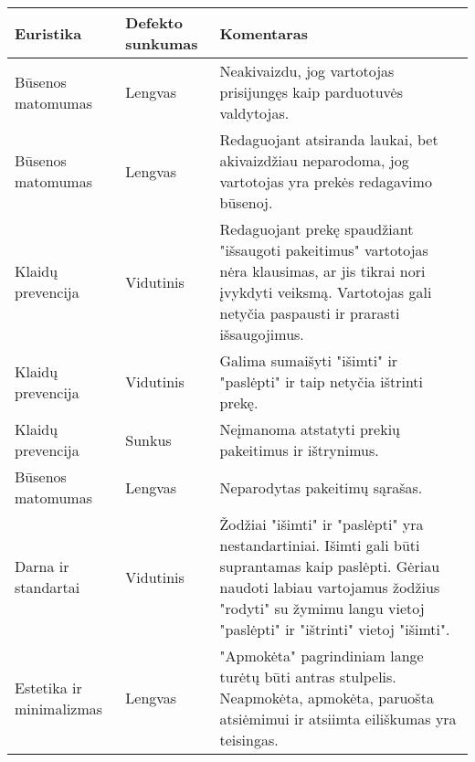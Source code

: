 \documentclass[oneside]{VUMIFPSkursinis}
\begin{document}
\begin{center}
	\begin{tabular}{ |p{3cm}| p{3cm} | p{11cm} | }
			\hline
			Euristika                    & Defekto sunkumas & Komentaras \\ \hline
			Būsenos matomumas            & Lengvas          &
				Neakivaizdu, jog vartotojas prisijungęs kaip parduotuvės valdytojas.
				\\ \hline
			Būsenos matomumas            & Lengvas          &
				Redaguojant atsiranda laukai, bet akivaizdžiau neparodoma, jog vartotojas yra prekės redagavimo būsenoj.
				\\ \hline
			Klaidų prevencija            & Vidutinis        &
				Redaguojant prekę spaudžiant "išsaugoti pakeitimus" vartotojas nėra klausimas, ar jis tikrai nori įvykdyti veiksmą.
				Vartotojas gali netyčia paspausti ir prarasti išsaugojimus.
				\\ \hline
			Klaidų prevencija            & Vidutinis        &
				Galima sumaišyti "išimti" ir "paslėpti" ir taip netyčia ištrinti prekę.
				\\ \hline
			Klaidų prevencija            & Sunkus           &
				Neįmanoma atstatyti prekių pakeitimus ir ištrynimus.
				\\ \hline
			Būsenos matomumas            & Lengvas          &
				Neparodytas pakeitimų sąrašas.
				\\ \hline
			Darna ir standartai          & Vidutinis        &
				Žodžiai "išimti" ir "paslėpti" yra nestandartiniai.
				Išimti gali būti suprantamas kaip paslėpti.
				Gėriau naudoti labiau vartojamus žodžius "rodyti" su žymimu langu vietoj "paslėpti" ir "ištrinti" vietoj "išimti".
				\\ \hline
			Estetika ir minimalizmas     & Lengvas          &
				"Apmokėta" pagrindiniam lange turėtų būti antras stulpelis.
				Neapmokėta, apmokėta, paruošta atsiėmimui ir atsiimta eiliškumas yra teisingas.
				\\ \hline
	\end{tabular}
\end{center}
\pagebreak
\end{document}
